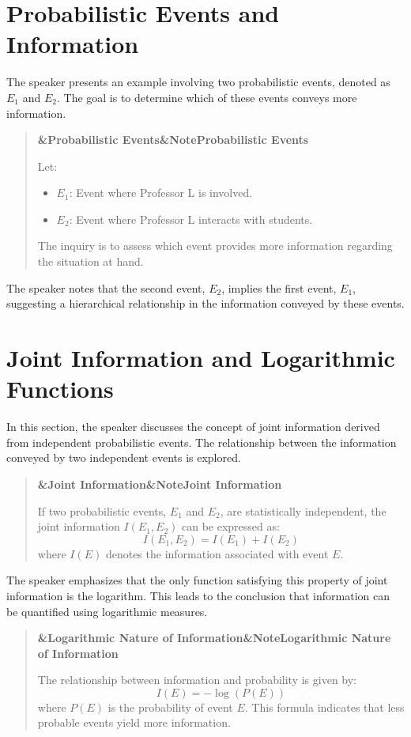 \documentclass[a4paper]{article}
\newcommand{\boxheading}[1]{%
  \par\smallskip
  \noindent\textbf{\ifx&#1&Note\else#1\fi}\par
  \smallskip
}
\newenvironment{thmbox}[1][]{%
  \begin{quote}\color{blue!60!black}\boxheading{#1}\normalcolor
}{\end{quote}}
\newenvironment{exbox}[1][]{%
  \begin{quote}\color{brown!70!black}\boxheading{#1}\normalcolor
}{\end{quote}}
\newenvironment{rembox}[1][]{%
  \begin{quote}\color{black!70}\boxheading{#1}\normalcolor
}{\end{quote}}
\begin{document}
\section{Probabilistic Events and Information}
The speaker presents an example involving two probabilistic events, denoted as $E_1$ and $E_2$. The goal is to determine which of these events conveys more information.

\begin{exbox}[Probabilistic Events]
Let:
\begin{itemize}
    \item $E_1$: Event where Professor L is involved.
    \item $E_2$: Event where Professor L interacts with students.
\end{itemize}
The inquiry is to assess which event provides more information regarding the situation at hand.
\end{exbox}

The speaker notes that the second event, $E_2$, implies the first event, $E_1$, suggesting a hierarchical relationship in the information conveyed by these events.

\section{Joint Information and Logarithmic Functions}
In this section, the speaker discusses the concept of joint information derived from independent probabilistic events. The relationship between the information conveyed by two independent events is explored.

\begin{rembox}[Joint Information]
If two probabilistic events, $E_1$ and $E_2$, are statistically independent, the joint information $I(E_1, E_2)$ can be expressed as:
\begin{equation}
I(E_1, E_2) = I(E_1) + I(E_2)
\end{equation}
where $I(E)$ denotes the information associated with event $E$.
\end{rembox}

The speaker emphasizes that the only function satisfying this property of joint information is the logarithm. This leads to the conclusion that information can be quantified using logarithmic measures.

\begin{thmbox}[Logarithmic Nature of Information]
The relationship between information and probability is given by:
\begin{equation}
I(E) = -\log(P(E))
\end{equation}
where $P(E)$ is the probability of event $E$. This formula indicates that less probable events yield more information.
\end{thmbox}
\end{document}

